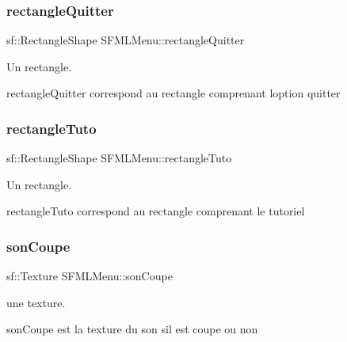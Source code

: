 \subsubsection{\texorpdfstring{rectangle\+Quitter}{rectangleQuitter}}
{\footnotesize\ttfamily sf\+::\+Rectangle\+Shape S\+F\+M\+L\+Menu\+::rectangle\+Quitter\hspace{0.3cm}{\ttfamily [private]}}



Un rectangle. 

rectangle\+Quitter correspond au rectangle comprenant l\textquotesingle{}option quitter \mbox{\label{class_s_f_m_l_menu_ae3661f8b9196011676527adf88221d41}} 
\subsubsection{\texorpdfstring{rectangle\+Tuto}{rectangleTuto}}
{\footnotesize\ttfamily sf\+::\+Rectangle\+Shape S\+F\+M\+L\+Menu\+::rectangle\+Tuto\hspace{0.3cm}{\ttfamily [private]}}



Un rectangle. 

rectangle\+Tuto correspond au rectangle comprenant le tutoriel \mbox{\label{class_s_f_m_l_menu_a2cf9080268fe86cd010822db2bb33cd8}} 
\subsubsection{\texorpdfstring{son\+Coupe}{sonCoupe}}
{\footnotesize\ttfamily sf\+::\+Texture S\+F\+M\+L\+Menu\+::son\+Coupe\hspace{0.3cm}{\ttfamily [private]}}



une texture. 

son\+Coupe est la texture du son s\textquotesingle{}il est coupe ou non \mbox{\label{class_s_f_m_l_menu_a5f594b7ac0011830d3f46f0cc2000797}} 
